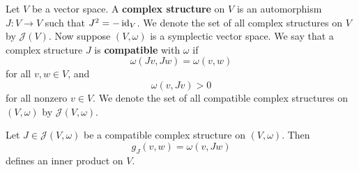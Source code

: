 \documentclass{amsart}
\begin{document}
\begin{definition}
    Let $V$ be a vector space. A \textbf{complex structure} on $V$ is an automorphism
    $J:V\to V$ such that $J^2=-\operatorname{id}_V$. We denote the set of all complex
    structures on $V$ by $\mathcal{J}(V)$. Now suppose $(V,\omega)$ is a symplectic
    vector space. We say that a complex structure $J$ is \textbf{compatible} with
    $\omega$ if
    \begin{equation*}
        \omega(Jv, Jw)=\omega(v,w)
    \end{equation*}
    for all $v,w\in V$, and
    \begin{equation*}
        \omega(v,Jv)>0
    \end{equation*}
    for all nonzero $v\in V$. We denote the set of all compatible complex structures
    on $(V,\omega)$ by $\mathcal{J}(V,\omega)$.
\end{definition}

\begin{lemma}
    Let $J\in\mathcal{J}(V,\omega)$ be a compatible complex structure on $(V,\omega)$.
    Then 
    \begin{equation*}
        g_J(v,w) = \omega(v,Jw)
    \end{equation*}
    defines an inner product on $V$.
    \label{lem:inner}
\end{lemma}
\end{document}
